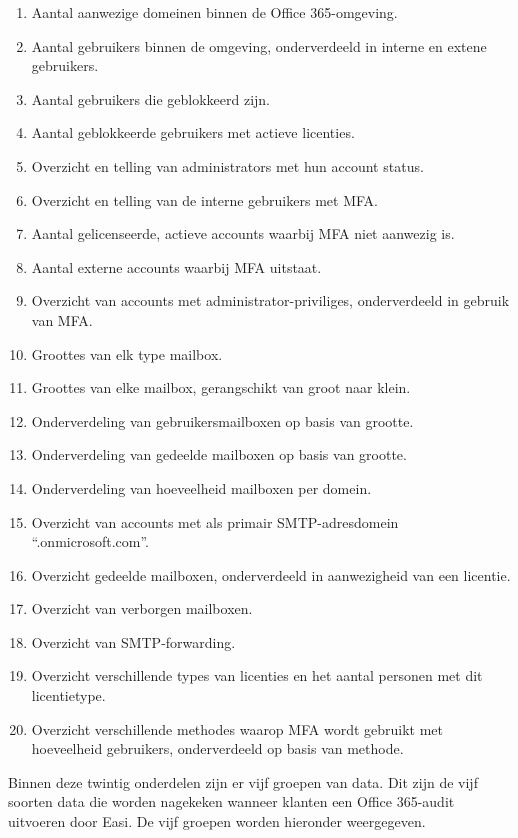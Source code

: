 \begin{enumerate}
    \item Aantal aanwezige domeinen binnen de Office 365-omgeving.
    \item Aantal gebruikers binnen de omgeving, onderverdeeld in interne
    en extene gebruikers.
    \item Aantal gebruikers die geblokkeerd zijn.
    \item Aantal geblokkeerde gebruikers met actieve licenties.
    \item Overzicht en telling van administrators met hun account status.
    \item Overzicht en telling van de interne gebruikers met \ac{MFA}.
    \item Aantal gelicenseerde, actieve accounts waarbij \ac{MFA} niet aanwezig is.
    \item Aantal externe accounts waarbij \ac{MFA} uitstaat.
    \item Overzicht van accounts met administrator-priviliges,
    onderverdeeld in gebruik van \ac{MFA}.
    \item Groottes van elk type mailbox.
    \item Groottes van elke mailbox, gerangschikt van groot naar klein.
    \item Onderverdeling van gebruikersmailboxen op basis van grootte.
    \item Onderverdeling van gedeelde mailboxen op basis van grootte.
    \item Onderverdeling van hoeveelheid mailboxen per domein.
    \item Overzicht van accounts met als primair \Ac{SMTP}-adresdomein “.onmicrosoft.com”.
    \item Overzicht gedeelde mailboxen, onderverdeeld in aanwezigheid van een licentie.
    \item Overzicht van verborgen mailboxen.
    \item Overzicht van \ac{SMTP}-forwarding.
    \item Overzicht verschillende types van licenties en het aantal personen met dit licentietype.
    \item Overzicht verschillende methodes waarop \ac{MFA} wordt gebruikt met hoeveelheid gebruikers, onderverdeeld op basis van methode.
\end{enumerate}

Binnen deze twintig onderdelen zijn er vijf groepen van data. Dit zijn de vijf soorten data die worden nagekeken wanneer klanten een Office 365-audit uitvoeren door Easi. De vijf groepen worden hieronder weergegeven. 

